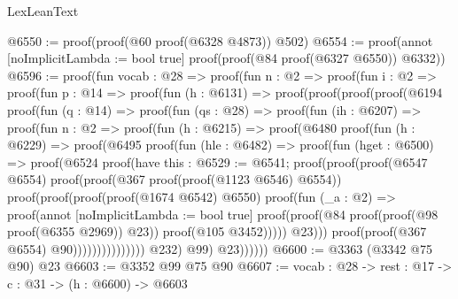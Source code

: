 \begin{lexlean}{LexLeanText}
\begin{coremodule}
@6550 := proof(proof(@60 proof(@6328 @4873)) @502)
@6554 := proof(annot [noImplicitLambda := bool true] proof(proof(@84 proof(@6327 @6550)) @6332))
@6596 := proof(fun {vocab : @28} =>
    proof(fun {n : @2} =>
      proof(fun {i : @2} =>
        proof(fun {p : @14} =>
          proof(fun (h : @6131) =>
            proof(proof(proof(proof(@6194
                      proof(fun (q : @14) =>
                        proof(fun (qs : @28) =>
                          proof(fun (ih : @6207) =>
                            proof(fun {n : @2} =>
                              proof(fun (h : @6215) =>
                                proof(@6480
                                    proof(fun (h : @6229) =>
                                      proof(@6495
                                          proof(fun (hle : @6482) =>
                                            proof(fun (hget : @6500) =>
                                              proof(@6524
                                                  proof(have this : @6529 := @6541;
                                                    proof(proof(proof(@6547 @6554)
                                                          proof(proof(@367
                                                                proof(proof(@1123 @6546) @6554))
                                                              proof(proof(proof(proof(@1674 @6542)
                                                                      @6550)
                                                                    proof(fun (_a : @2) =>
                                                                      proof(annot [noImplicitLambda := bool true]
                                                                        proof(proof(@84
                                                                              proof(proof(@98
                                                                                    proof(@6355
                                                                                        @2969))
                                                                                  @23))
                                                                            proof(@105 @3452)))))
                                                                  @23)))
                                                        proof(proof(@367 @6554) @90)))))))))))))))
                    @232)
                  @99)
                @23))))))
@6600 := @3363 (@3342 @75 @90) @23
@6603 := @3352 @99 @75 @90
@6607 := {vocab : @28} -> {rest : @17} -> {c : @31} -> (h : @6600) -> @6603

\end{coremodule}
\end{lexlean}
